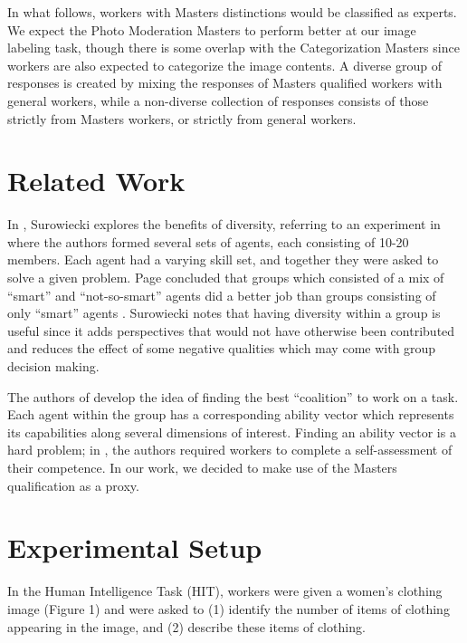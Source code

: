 \documentclass{chi2012}
\newcommand{\tab}{\hspace*{2em}}
\begin{document}
\tab In what follows, workers with Masters distinctions would be classified as experts. We expect the Photo Moderation Masters to perform better at our image labeling task, though there is some overlap with the Categorization Masters since workers are also expected to categorize the image contents. A diverse group of responses is created by mixing the responses of Masters qualified workers with general workers, while a non-diverse collection of responses consists of those strictly from Masters workers, or strictly from general workers.

\section{Related Work}
\tab In \cite{wisdomOfCrowds}, Surowiecki explores the benefits of diversity, referring to an experiment in \cite{HongPage:2000} where the authors formed several sets of agents, each consisting of 10-20 members. Each agent had a varying skill set, and together they were asked to solve a given problem. Page concluded that groups which consisted of a mix of ``smart'' and ``not-so-smart'' agents did a better job than groups consisting of only ``smart'' agents \cite{HongPage:2000}. Surowiecki notes that having diversity within a group is useful since it adds perspectives that would not have otherwise been contributed and reduces the effect of some negative qualities which may come with group decision making.

\tab The authors of \cite{ShahafHorvitz:2010} develop the idea of finding the best ``coalition'' to work on a task. Each agent within the group has a corresponding ability vector which represents its capabilities along several dimensions of interest. Finding an ability vector is a hard problem; in \cite{ShahafHorvitz:2010}, the authors required workers to complete a self-assessment of their competence. In our work, we decided to make use of the Masters qualification as a proxy. 

\section{Experimental Setup}
\tab In the Human Intelligence Task (HIT), workers were given a women's clothing image (Figure 1) and were asked to (1) identify the number of items of clothing appearing in the image, and (2) describe these items of clothing. 
\end{document}
